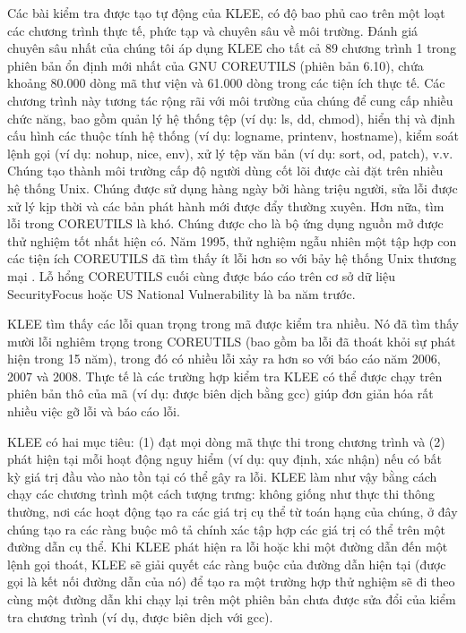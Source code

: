 \documentclass[12pt,a4paper]{article}
\begin{document}
\indent Các bài kiểm tra được tạo tự động của KLEE, có độ bao phủ cao trên một loạt các chương trình thực tế, phức tạp và chuyên sâu về môi trường. Đánh giá chuyên sâu nhất của chúng tôi áp dụng KLEE cho tất cả 89 chương trình 1 trong phiên bản ổn định mới nhất của GNU COREUTILS (phiên bản 6.10), chứa khoảng 80.000 dòng mã thư viện và 61.000 dòng trong các tiện ích thực tế. Các chương trình này tương tác rộng rãi với môi trường của chúng để cung cấp nhiều chức năng, bao gồm quản lý hệ thống tệp (ví dụ: ls, dd, chmod), hiển thị và định cấu hình các thuộc tính hệ thống (ví dụ: logname, printenv, hostname), kiểm soát lệnh gọi (ví dụ: nohup, nice, env), xử lý tệp văn bản (ví dụ: sort, od, patch), v.v. Chúng tạo thành môi trường cấp độ người dùng cốt lõi được cài đặt trên nhiều hệ thống Unix. Chúng được sử dụng hàng ngày bởi hàng triệu người, sửa lỗi được xử lý kịp thời và các bản phát hành mới được đẩy thường xuyên. Hơn nữa, tìm lỗi trong COREUTILS là khó. Chúng được cho là bộ ứng dụng nguồn mở được thử nghiệm tốt nhất hiện có. Năm 1995, thử nghiệm ngẫu nhiên một tập hợp con các tiện ích COREUTILS đã tìm thấy ít lỗi hơn so với bảy hệ thống Unix thương mại \cite{miller2000re}. Lỗ hổng COREUTILS cuối cùng được báo cáo trên cơ sở dữ liệu SecurityFocus hoặc US National Vulnerability là ba năm trước.

\indent KLEE tìm thấy các lỗi quan trọng trong mã được kiểm tra nhiều. Nó đã tìm thấy mười lỗi nghiêm trọng trong COREUTILS (bao gồm ba lỗi đã thoát khỏi sự phát hiện trong 15 năm), trong đó có nhiều lỗi xảy ra hơn so với báo cáo năm 2006, 2007 và 2008. Thực tế là các trường hợp kiểm tra KLEE có thể được chạy trên phiên bản thô của mã (ví dụ: được biên dịch bằng gcc) giúp đơn giản hóa rất nhiều việc gỡ lỗi và báo cáo lỗi.

\indent KLEE có hai mục tiêu: (1) đạt mọi dòng mã thực thi trong chương trình và (2) phát hiện tại mỗi hoạt động nguy hiểm (ví dụ: quy định, xác nhận) nếu có bất kỳ giá trị đầu vào nào tồn tại có thể gây ra lỗi. KLEE làm như vậy bằng cách chạy các chương trình một cách tượng trưng: không giống như thực thi thông thường, nơi các hoạt động tạo ra các giá trị cụ thể từ toán hạng của chúng, ở đây chúng tạo ra các ràng buộc mô tả chính xác tập hợp các giá trị có thể trên một đường dẫn cụ thể. Khi KLEE phát hiện ra lỗi hoặc khi một đường dẫn đến một lệnh gọi thoát, KLEE sẽ giải quyết các ràng buộc của đường dẫn hiện tại (được gọi là kết nối đường dẫn của nó) để tạo ra một trường hợp thử nghiệm sẽ đi theo cùng một đường dẫn khi chạy lại trên một phiên bản chưa được sửa đổi của kiểm tra chương trình (ví dụ, được biên dịch với gcc).
\end{document}
